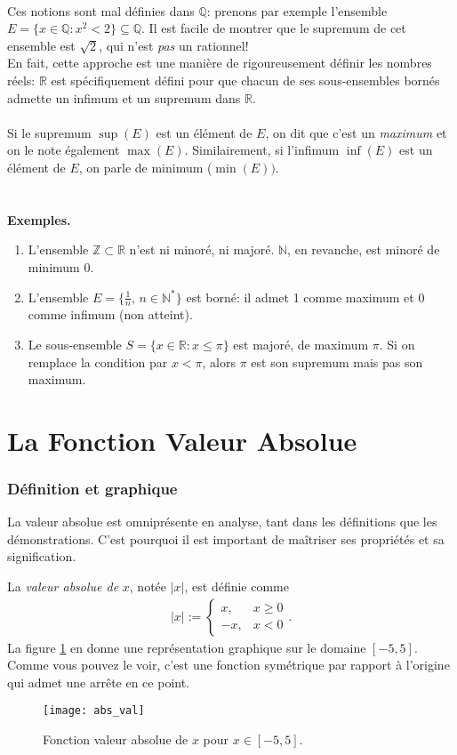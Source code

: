 \documentclass[oneside,11pt,french,table]{book}
\theoremstyle{definition}
\theoremstyle{plain}
\theoremstyle{remark}
\begin{document}
\paragraph{}
Ces notions sont mal définies dans $\mathbb{Q}$: prenons par exemple l'ensemble $E = \{ x \in \mathbb{Q} : x^2 < 2 \} \subseteq \mathbb{Q}$. Il est facile de montrer que le supremum de cet ensemble est $\sqrt{2}$, qui n'est \textit{pas} un rationnel! \\
En fait, cette approche est une manière de rigoureusement définir les nombres réels: $\mathbb{R}$ est spécifiquement défini pour que chacun de ses sous-ensembles bornés admette un infimum et un supremum dans $\mathbb{R}$. \\ \\ 
Si le supremum $\sup(E)$ est un élément de $E$, on dit que c'est un \textit{maximum} et on le note également $\max(E)$. Similairement, si l'infimum $\inf(E)$ est un élément de $E$, on parle de minimum ($\min(E))$. \\
\\ \\
\textbf{Exemples.}
\begin{enumerate}
    \item L'ensemble $\mathbb Z \subset \mathbb R$ n'est ni minoré, ni majoré. $\mathbb{N}$, en revanche, est minoré de minimum 0.
    \item L'ensemble $E = \{ \frac{1}{n}, \, n \in \mathbb{N}^* \}$ est borné: il admet 1 comme maximum et 0 comme infimum (non atteint).
    \item Le sous-ensemble $S = \{x \in \mathbb R : x \leq \pi \}$ est majoré, de maximum $\pi$. Si on remplace la condition par $x < \pi$, alors $\pi$ est son supremum mais pas son maximum.
\end{enumerate}
\section{La Fonction Valeur Absolue}
    \subsubsection{Définition et graphique}
    \noindent
    La valeur absolue est omniprésente en analyse, tant dans les définitions que les démonstrations. C'est pourquoi il est important de maîtriser ses propriétés et sa signification. 
    
    La \textit{valeur absolue de }$x$, notée $|x|$, est définie comme
    \begin{align*}
        |x|:=\begin{cases} x,& x\ge 0 \\ -x,& x<0
        \end{cases}.
    \end{align*}
    La figure \ref{fig:abs_val} en donne une représentation graphique sur le domaine $[-5,5]$. Comme vous pouvez le voir, c'est une fonction symétrique par rapport à l'origine qui admet une arrête en ce point.
    \begin{figure}[htb]
        \centering
        \texttt{[image: abs\_val]}
        \caption{Fonction valeur absolue de $x$ pour $x\in[-5,5]$.}
        \label{fig:abs_val}
    \end{figure}
    
\end{document}
